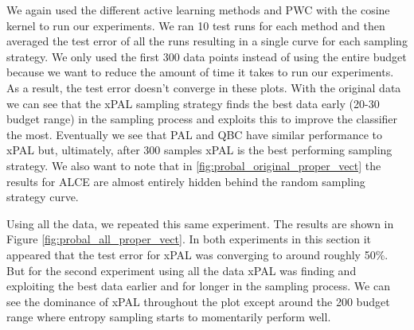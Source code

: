 We again used the different active learning methods and PWC with the cosine kernel to run our experiments. We ran 10 test runs for each method and then averaged the test error of all the runs resulting in a single curve for each sampling strategy. We only used the first 300 data points instead of using the entire budget because we want to reduce the amount of time it takes to run our experiments. As a result, the test error doesn't converge in these plots. With the original data we can see that the xPAL sampling strategy finds the best data early (20-30 budget range) in the sampling process and exploits this to improve the classifier the most. Eventually we see that PAL and QBC have similar performance to xPAL but, ultimately, after 300 samples xPAL is the best performing sampling strategy. We also want to note that in \ref{fig:probal_original_proper_vect} the results for ALCE are almost entirely hidden behind the random sampling strategy curve. 

Using all the data, we repeated this same experiment. The results are shown in Figure \ref{fig:probal_all_proper_vect}. In both experiments in this section it appeared that the test error for xPAL was converging to around roughly 50\%. But for the second experiment using all the data xPAL was finding and exploiting the best data earlier and for longer in the sampling process. We can see the dominance of xPAL throughout the plot except around the 200 budget range where entropy sampling starts to momentarily perform well.

